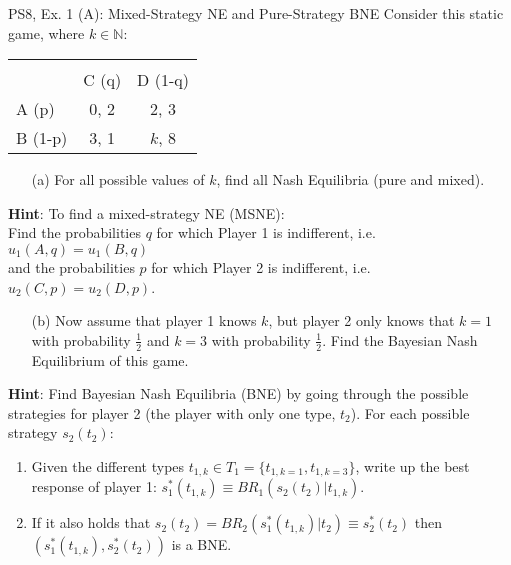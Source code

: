 \begin{frame}{PS8, Ex. 1 (A): Mixed-Strategy NE and Pure-Strategy BNE}
    Consider this static game, where $k\in\mathbb{N}:$
    \vspace{-16pt}
    \begin{table}
      \begin{tabular}{l|c|c|}
        \multicolumn{1}{c}{} & \multicolumn{2}{c}{} \\
        \multicolumn{1}{c}{} & \multicolumn{1}{c}{C (q)} & \multicolumn{1}{c}{D (1-q)} \\\cline{2-3}
        A (p)   & 0, 2 & 2, 3 \\\cline{2-3}
        B (1-p) & 3, 1 & $k$, 8 \\\cline{2-3}
      \end{tabular}
    \end{table}
    \begin{itemize}
      \item[(a)] For all possible values of $k$, find all Nash Equilibria (pure and mixed).
    \end{itemize}
    \textbf{Hint}: To find a mixed-strategy NE (MSNE):\\
    Find the probabilities $q$ for which Player 1 is indifferent, i.e. $u_1(A,q)=u_1(B,q)$\\
    and the probabilities $p$ for which Player 2 is indifferent, i.e. $u_2(C,p)=u_2(D,p)$.
    \begin{itemize}
      \item[(b)] Now assume that player 1 knows $k$, but player 2 only knows that $k = 1$ with probability $\frac{1}{2}$ and $k = 3$ with probability $\frac{1}{2}$. Find the Bayesian Nash Equilibrium of this game.
    \end{itemize}
    \textbf{Hint}: Find Bayesian Nash Equilibria (BNE) by going through the possible strategies for player 2 (the player with only one type, $t_2$). For each possible strategy $s_2(t_2)$:
    \begin{enumerate}\normalsize
      \item Given the different types $t_{1,k}\in T_1=\{t_{1,k=1},t_{1,k=3}\}$, write up the best response of player 1: $s_1^*(t_{1,k})\equiv BR_1\left(s_2(t_2)|t_{1,k}\right)$.
      \item If it also holds that $s_2(t_2)=BR_2\left(s_1^*(t_{1,k})|t_2\right)\equiv s_2^*(t_2)$ then $\left(s_1^*(t_{1,k}),s_2^*(t_2)\right)$ is a BNE.
    \end{enumerate}
    \vfill\null
\end{frame}


